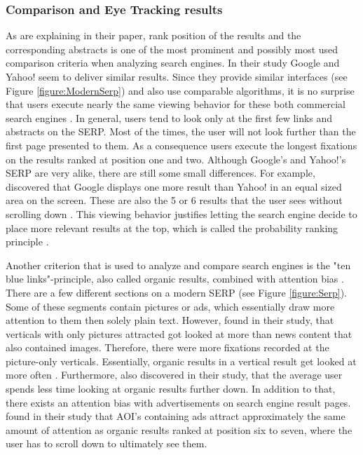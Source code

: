 \subsubsection{Comparison and Eye Tracking results}
As \textcite{pan2007google, wang2016beyond} are explaining in their paper, rank position of the results and the corresponding abstracts is one of the most prominent and possibly most used comparison criteria when analyzing search engines. 
In their study \textcite{lorigo2008eye} Google and Yahoo! seem to deliver similar results. Since they provide similar interfaces (see Figure \ref{figure:ModernSerp}) and also use comparable algorithms, it is no surprise that users execute nearly the same viewing behavior for these both commercial search engines \autocite{lorigo2008eye}. 
In general, users tend to look only at the first few links and abstracts on the SERP. Most of the times, the user will not look further than the first page presented to them. As a consequence users execute the longest fixations on the results ranked at position one and two\autocite{granka2004eye, lorigo2008eye}. Although Google's and Yahoo!'s SERP are very alike, there are still some small differences. For example, \textcite{lorigo2008eye} discovered that Google displays one more result than Yahoo! in an equal sized area on the screen. These are also the 5 or 6 results that the user sees without scrolling down \autocite{lorigo2008eye}. 
This viewing behavior justifies letting the search engine decide to place more relevant results at the top, which is called the probability ranking principle \autocite{wang2016beyond}.

Another criterion that is used to analyze and compare search engines is the "ten blue links"-principle, also called organic results, combined with attention bias \autocite{buscher2010good, liu2015influence}. There are a few different sections on a modern SERP (see Figure \ref{figure:Serp}). Some of these segments contain pictures or ads, which essentially draw more attention to them then solely plain text. 
However, \textcite{liu2015influence} found in their study, that verticals with only pictures attracted got looked at more than news content that also contained images. Therefore, there were more fixations recorded at the picture-only verticals. 
Essentially, organic results in a vertical result get looked at more often \autocite{wang2016beyond}.
Furthermore, \textcite{liu2015influence, buscher2010good} also discovered in their study, that the average user spends less time looking at organic results further down. In addition to that, there exists an attention bias with advertisements on search engine result pages. \textcite{buscher2010good} found in their study that AOI's containing ads attract approximately the same amount of attention as organic results ranked at position six to seven, where the user has to scroll down to ultimately see them.

